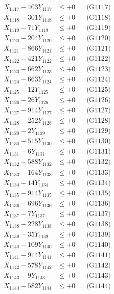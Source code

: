 \documentclass[a4paper,10pt]{article}
\begin{document}
{\begin{align}
X_{1117} - 403Y_{1117} &\leq +0 && \text{(G1117)} \\
X_{1118} - 301Y_{1118} &\leq +0 && \text{(G1118)} \\
X_{1119} - 71Y_{1119} &\leq +0 && \text{(G1119)} \\
X_{1120} - 204Y_{1120} &\leq +0 && \text{(G1120)} \\
\allowbreak
X_{1121} - 866Y_{1121} &\leq +0 && \text{(G1121)} \\
X_{1122} - 421Y_{1122} &\leq +0 && \text{(G1122)} \\
X_{1123} - 662Y_{1123} &\leq +0 && \text{(G1123)} \\
X_{1124} - 663Y_{1124} &\leq +0 && \text{(G1124)} \\
X_{1125} - 12Y_{1125} &\leq +0 && \text{(G1125)} \\
X_{1126} - 26Y_{1126} &\leq +0 && \text{(G1126)} \\
X_{1127} - 914Y_{1127} &\leq +0 && \text{(G1127)} \\
X_{1128} - 252Y_{1128} &\leq +0 && \text{(G1128)} \\
X_{1129} - 2Y_{1129} &\leq +0 && \text{(G1129)} \\
X_{1130} - 515Y_{1130} &\leq +0 && \text{(G1130)} \\
\allowbreak
X_{1131} - 6Y_{1131} &\leq +0 && \text{(G1131)} \\
X_{1132} - 588Y_{1132} &\leq +0 && \text{(G1132)} \\
X_{1133} - 164Y_{1133} &\leq +0 && \text{(G1133)} \\
X_{1134} - 14Y_{1134} &\leq +0 && \text{(G1134)} \\
X_{1135} - 914Y_{1135} &\leq +0 && \text{(G1135)} \\
X_{1136} - 696Y_{1136} &\leq +0 && \text{(G1136)} \\
X_{1137} - 7Y_{1137} &\leq +0 && \text{(G1137)} \\
X_{1138} - 228Y_{1138} &\leq +0 && \text{(G1138)} \\
X_{1139} - 35Y_{1139} &\leq +0 && \text{(G1139)} \\
X_{1140} - 109Y_{1140} &\leq +0 && \text{(G1140)} \\
\allowbreak
X_{1141} - 914Y_{1141} &\leq +0 && \text{(G1141)} \\
X_{1142} - 578Y_{1142} &\leq +0 && \text{(G1142)} \\
X_{1143} - 9Y_{1143} &\leq +0 && \text{(G1143)} \\
X_{1144} - 582Y_{1144} &\leq +0 && \text{(G1144)} \\

\end{align}}
\end{document}
